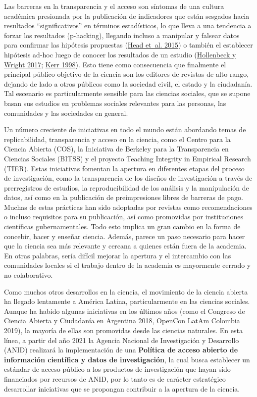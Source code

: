 \documentclass[
  letterpaper,
  DIV=11,
  numbers=noendperiod]{scrreprt}
\begin{document}
Las barreras en la transparencia y el acceso son síntomas de una cultura
académica presionada por la publicación de indicadores que están
sesgados hacia resultados ``significativos'' en términos estadísticos,
lo que lleva a una tendencia a forzar los resultados (p-hacking),
llegando incluso a manipular y falsear datos para confirmar las
hipótesis propuestas (\protect\hyperlink{ref-head_extent_2015}{Head
et~al. 2015}) o también el establecer hipótesis ad-hoc luego de conocer
los resultados de un estudio
(\protect\hyperlink{ref-hollenbeck_harking_2017}{Hollenbeck y Wright
2017}; \protect\hyperlink{ref-kerr_harking_1998}{Kerr 1998}). Esto tiene
como consecuencia que finalmente el principal público objetivo de la
ciencia son los editores de revistas de alto rango, dejando de lado a
otros públicos como la sociedad civil, el estado y la ciudadanía. Tal
escenario es particularmente sensible para las ciencias sociales, que se
supone basan sus estudios en problemas sociales relevantes para las
personas, las comunidades y las sociedades en general.

Un número creciente de iniciativas en todo el mundo están abordando
temas de replicabilidad, transparencia y acceso en la ciencia, como el
Centro para la Ciencia Abierta (COS), la Iniciativa de Berkeley para la
Transparencia en Ciencias Sociales (BITSS) y el proyecto Teaching
Integrity in Empirical Research (TIER). Estas iniciativas fomentan la
apertura en diferentes etapas del proceso de investigación, como la
transparencia de los diseños de investigación a través de prerregistros
de estudios, la reproducibilidad de los análisis y la manipulación de
datos, así como en la publicación de preimpresiones libres de barreras
de pago. Muchas de estas prácticas han sido adoptadas por revistas como
recomendaciones o incluso requisitos para su publicación, así como
promovidas por instituciones científicas gubernamentales. Todo esto
implica un gran cambio en la forma de concebir, hacer y enseñar ciencia.
Además, parece un paso necesario para hacer que la ciencia sea más
relevante y cercana a quienes están fuera de la academia. En otras
palabras, sería difícil mejorar la apertura y el intercambio con las
comunidades locales si el trabajo dentro de la academia es mayormente
cerrado y no colaborativo.

Como muchos otros desarrollos en la ciencia, el movimiento de la ciencia
abierta ha llegado lentamente a América Latina, particularmente en las
ciencias sociales. Aunque ha habido algunas iniciativas en los últimos
años (como el Congreso de Ciencia Abierta y Ciudadanía en Argentina
2018, OpenCon LatAm Colombia 2019), la mayoría de ellas son promovidas
desde las ciencias naturales. En esta línea, a partir del año 2021 la
Agencia Nacional de Investigación y Desarrollo (ANID) realizará la
implementación de una \textbf{Política de acceso abierto de información
científica y datos de investigación}, la cual busca establecer un
estándar de acceso público a los productos de investigación que hayan
sido financiados por recursos de ANID, por lo tanto es de carácter
estratégico desarrollar iniciativas que se propongan contribuir a la
apertura de la ciencia.
\end{document}
